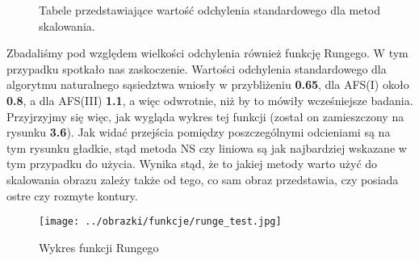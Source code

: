 \begin{figure}[h!tb]
\begin{center}
\caption{Tabele przedstawiające wartość odchylenia standardowego dla metod skalowania.}
\end{center}
\end{figure}

Zbadaliśmy pod względem wielkości odchylenia również funkcję Rungego. W tym przypadku spotkało
nas zaskoczenie. Wartości odchylenia standardowego dla algorytmu naturalnego sąsiedztwa wniosły
w przybliżeniu \textbf{0.65}, dla AFS(I) około \textbf{0.8}, a dla AFS(III) \textbf{1.1}, a więc
odwrotnie, niż by to mówiły wcześniejsze badania. Przyjrzyjmy się więc, jak wygląda wykres tej funkcji
(został on zamieszczony na rysunku \textbf{3.6}). Jak widać przejścia pomiędzy poszczególnymi odcieniami
są na tym rysunku gładkie, stąd metoda NS czy liniowa są jak najbardziej wskazane w tym przypadku do użycia.
Wynika stąd, że to jakiej metody warto użyć do skalowania obrazu zależy także od tego, co sam obraz przedstawia,
czy posiada ostre czy rozmyte kontury.
\begin{figure}[h!tb]
\begin{center}
\texttt{[image: ../obrazki/funkcje/runge\_test.jpg]}
\caption{Wykres funkcji Rungego}
\end{center}
\end{figure}

